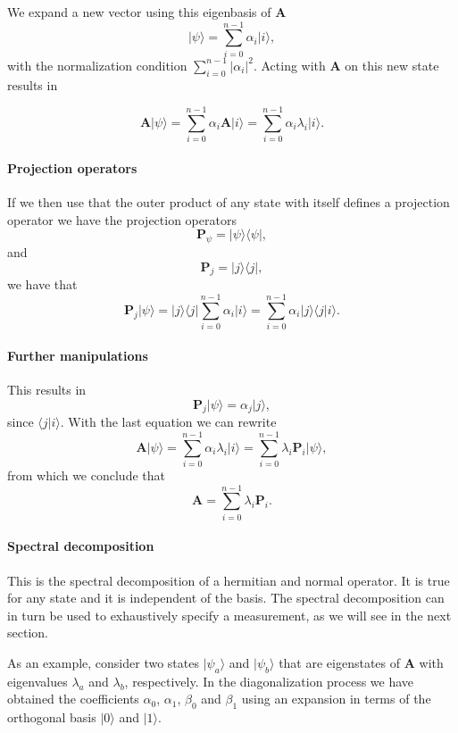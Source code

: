 We expand a new vector using this eigenbasis of $\bm{A}$
\[
\vert \psi \rangle = \sum_{i=0}^{n-1}\alpha_i\vert i\rangle,
\]
with the normalization condition $\sum_{i=0}^{n-1}\vert \alpha_i\vert^2$.
Acting with $\bm{A}$ on this new state results in

\[
\bm{A}\vert \psi \rangle = \sum_{i=0}^{n-1}\alpha_i\bm{A}\vert i\rangle=\sum_{i=0}^{n-1}\alpha_i\lambda_i\vert i\rangle.
\]


\paragraph{Projection operators}

If we then use that the outer product of any state with itself defines a projection operator we have the projection operators
\[
\bm{P}_{\psi} = \vert \psi\rangle\langle \psi\vert,
\]
and
\[
\bm{P}_{j} = \vert j\rangle\langle j\vert,
\]
we have that 
\[
\bm{P}_{j}\vert \psi\rangle=\vert j\rangle\langle j\vert\sum_{i=0}^{n-1}\alpha_i\vert i\rangle=\sum_{i=0}^{n-1}\alpha_i\vert j\rangle\langle j\vert i\rangle.
\]


\paragraph{Further manipulations}

This results in
\[
\bm{P}_{j}\vert \psi\rangle=\alpha_j\vert j\rangle,
\]
since $\langle j\vert i\rangle$.
With the last equation we can rewrite
\[
\bm{A}\vert \psi \rangle = \sum_{i=0}^{n-1}\alpha_i\lambda_i\vert i\rangle=\sum_{i=0}^{n-1}\lambda_i\bm{P}_i\vert \psi\rangle,
\]
from which we conclude that
\[
\bm{A}=\sum_{i=0}^{n-1}\lambda_i\bm{P}_i.
\]


\paragraph{Spectral decomposition}

This is the spectral decomposition of a hermitian and normal
operator. It is true for any state and it is independent of the
basis. The spectral decomposition can in turn be used to exhaustively
specify a measurement, as we will see in the next section.

As an example, consider two states $\vert \psi_a\rangle$ and $\vert
\psi_b\rangle$ that are eigenstates of $\bm{A}$ with eigenvalues
$\lambda_a$ and $\lambda_b$, respectively. In the diagonalization
process we have obtained the coefficients $\alpha_0$, $\alpha_1$,
$\beta_0$ and $\beta_1$ using an expansion in terms of the orthogonal
basis $\vert 0\rangle$ and $\vert 1\rangle$.


